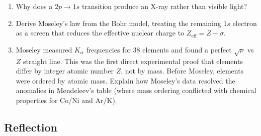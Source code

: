 \documentclass[12pt, a4paper]{book}
\begin{document}
\begin{deepbox}
\begin{enumerate}[label=\textbf{D\arabic*.}]
        \begin{enumerate}[label=(\alph*)]
          \item Why does a $2p \to 1s$ transition produce
                an X-ray rather than visible light?
          \item Derive Moseley's law from the Bohr model,
                treating the remaining $1s$ electron as
                a screen that reduces the effective nuclear
                charge to $Z_\text{eff} = Z - \sigma$.
          \item Moseley measured $K_\alpha$ frequencies
                for 38 elements and found a perfect
                $\sqrt{\nu}$ vs $Z$ straight line.
                This was the first direct experimental
                proof that elements differ by integer
                atomic number $Z$, not by mass.
                Before Moseley, elements were ordered by
                atomic mass.
                Explain how Moseley's data resolved
                the anomalies in Mendeleev's table
                (where mass ordering conflicted with
                chemical properties for Co/Ni and Ar/K).
        \end{enumerate}

\end{enumerate}
\end{deepbox}

\subsection*{Reflection}
\end{document}
